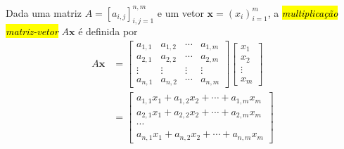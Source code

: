 Dada uma matriz $A = [a_{i,j}]_{i,j=1}^{n,m}$ e um vetor $\pmb{x} = (x_i)_{i=1}^m$, a \hl{\emph{multiplicação matriz-vetor}} $A\pmb{x}$ é definida por
\begin{subequations}
  \begin{align}
    A\pmb{x} &=\begin{bmatrix}
      a_{1,1} & a_{1,2} & \cdots & a_{1,m}\\
      a_{2,1} & a_{2,2} & \cdots & a_{2,m}\\
      \vdots & \vdots & \vdots & \vdots\\
      a_{n,1} & a_{n,2} & \cdots & a_{n,m}
    \end{bmatrix}\begin{bmatrix}
      x_1\\
      x_2\\
      \vdots\\
      x_m
    \end{bmatrix}\\
    &=
      \begin{bmatrix}
        a_{1,1}x_1 + a_{1,2}x_2 + \cdots + a_{1,m}x_m\\
        a_{2,1}x_1 + a_{2,2}x_2 + \cdots + a_{2,m}x_m\\
        \cdots\\
        a_{n,1}x_1 + a_{n,2}x_2 + \cdots + a_{n,m}x_m
      \end{bmatrix}
  \end{align}
\end{subequations}

